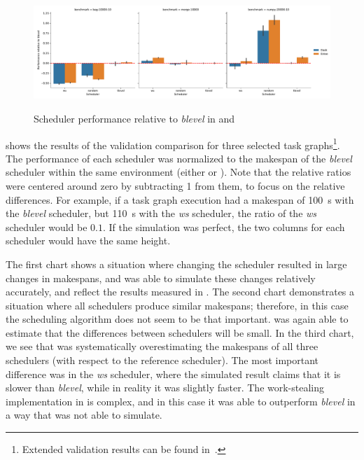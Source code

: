 \begin{figure}
	\centering
	\includegraphics[width=\textwidth]{imgs/estee/charts/estee-validation}\\
	\caption{Scheduler performance relative to \emph{blevel} in \dask{} and \estee}
	\label{fig:estee-validation}
\end{figure}

 shows the results of the validation comparison for three selected
task graphs\footnote{Extended validation results can be found in~\cite{estee}.}. The performance of each scheduler was normalized to the
makespan of the \emph{blevel} scheduler within the same environment (either
\estee{} or \dask{}). Note that the relative ratios were centered
around zero by subtracting \num{1} from them, to focus on the relative differences.
For example, if a task graph execution had a makespan of \SI{100}{\second} with the
\emph{blevel} scheduler, but \SI{110}{\second} with the \emph{ws}
scheduler, the ratio of the \emph{ws} scheduler would be $0.1$. If
the simulation was perfect, the two columns for each scheduler would have the same height.

The first chart shows a situation where changing the scheduler resulted in large changes in
makespans, and \estee{} was able to simulate these changes relatively accurately,
and reflect the results measured in \dask{}. The second chart demonstrates a
situation where all schedulers produce similar makespans; therefore, in this case the scheduling
algorithm does not seem to be that important. \estee{} was again able to estimate
that the differences between schedulers will be small. In the third chart, we see that
\estee{} was systematically overestimating the makespans of all three schedulers
(with respect to the reference scheduler). The most important difference was in the
\emph{ws} scheduler, where the simulated result claims that it is slower than
\emph{blevel}, while in reality it was slightly faster. The work-stealing implementation
in \dask{} is complex, and in this case it was able to outperform
\emph{blevel} in a way that \estee{} was not able to simulate.

